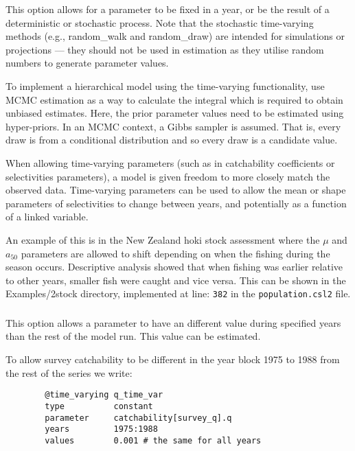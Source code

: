 This option allows for a parameter to be fixed in a year, or be the result of a deterministic or stochastic process. Note that the stochastic time-varying methods (e.g., random\_walk and random\_draw) are intended for simulations or projections --- they should not be used in estimation as they utilise random numbers to generate parameter values. 

To implement a hierarchical model using the time-varying functionality, use MCMC estimation as a way to calculate the integral which is required to obtain unbiased estimates. Here, the prior parameter values need to be estimated using hyper-priors. In an MCMC context, a Gibbs sampler is assumed. That is, every draw is from a conditional distribution and so every draw is a candidate value.

When allowing time-varying parameters (such as in catchability coefficients or selectivities parameters), a model is given freedom to more closely match the observed data. Time-varying parameters can be used to allow the mean or shape parameters of selectivities to change between years, and potentially as a function of a linked variable.

An example of this is in the New Zealand hoki stock assessment where the $\mu$ and $a_{50}$ parameters are allowed to shift depending on when the fishing during the season occurs. Descriptive analysis showed that when fishing was earlier relative to other years, smaller fish were caught and vice versa. This can be shown in the Examples/2stock directory, implemented at line: \texttt{382} in the \texttt{population.csl2} file.

\subsubsection[Constant (year blocks)]{}\label{sec:TimeVarying-Constant}

This option allows a parameter to have an different value during specified years than the rest of the model run. This value can be estimated.

To allow survey catchability to be different in the year block 1975 to 1988 from the rest of the series we write:

{\small{\begin{verbatim}
		@time_varying q_time_var
		type          constant
		parameter     catchability[survey_q].q
		years         1975:1988
		values        0.001 # the same for all years
		\end{verbatim}}}

